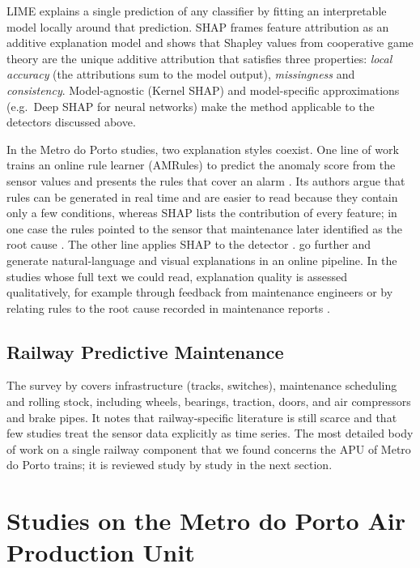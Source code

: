 LIME \citep{ribeiro2016lime} explains a single prediction of any classifier by fitting an interpretable model locally around that prediction. SHAP \citep{lundberg2017shap} frames feature attribution as an additive explanation model and shows that Shapley values from cooperative game theory are the unique additive attribution that satisfies three properties: \emph{local accuracy} (the attributions sum to the model output), \emph{missingness} and \emph{consistency}. Model-agnostic (Kernel SHAP) and model-specific approximations (e.g.\ Deep SHAP for neural networks) make the method applicable to the detectors discussed above.

In the Metro do Porto studies, two explanation styles coexist. One line of work trains an online rule learner (AMRules) to predict the anomaly score from the sensor values and presents the rules that cover an alarm \citep{silva2023adversarial,gama2024neurosymbolic}. Its authors argue that rules can be generated in real time and are easier to read because they contain only a few conditions, whereas SHAP lists the contribution of every feature; in one case the rules pointed to the sensor that maintenance later identified as the root cause \citep{silva2023adversarial}. The other line applies SHAP to the detector \citep{davari2024explaining}. \citet{garciamendez2025explainable} go further and generate natural-language and visual explanations in an online pipeline. In the studies whose full text we could read, explanation quality is assessed qualitatively, for example through feedback from maintenance engineers \citep{gama2024neurosymbolic} or by relating rules to the root cause recorded in maintenance reports \citep{silva2023adversarial}.

\subsection{Railway Predictive Maintenance}
\label{sec:railway}

The survey by \citet{davari2021survey} covers infrastructure (tracks, switches), maintenance scheduling and rolling stock, including wheels, bearings, traction, doors, and air compressors and brake pipes. It notes that railway-specific literature is still scarce and that few studies treat the sensor data explicitly as time series. The most detailed body of work on a single railway component that we found concerns the APU of Metro do Porto trains; it is reviewed study by study in the next section.

\section{Studies on the Metro do Porto Air Production Unit}
\label{sec:metropt}

